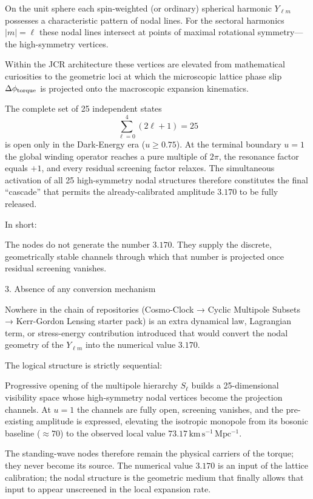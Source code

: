 On the unit sphere each spin-weighted (or ordinary) spherical harmonic \(Y_{\ell m}\) possesses a characteristic pattern of nodal lines. For the sectoral harmonics \(|m|=\ell\) these nodal lines intersect at points of maximal rotational symmetry—the high-symmetry vertices.

Within the JCR architecture these vertices are elevated from mathematical curiosities to the geometric loci at which the microscopic lattice phase slip \(\Delta\phi_{\rm torque}\) is projected onto the macroscopic expansion kinematics.  

The complete set of 25 independent states  
  \[
  \sum_{\ell=0}^{4}(2\ell+1)=25
  \]
  is open only in the Dark-Energy era (\(u\ge 0.75\)).  
At the terminal boundary \(u=1\) the global winding operator reaches a pure multiple of \(2\pi\), the resonance factor equals \(+1\), and every residual screening factor relaxes.  
The simultaneous activation of all 25 high-symmetry nodal structures therefore constitutes the final “cascade” that permits the already-calibrated amplitude \(3.170\) to be fully released.

In short:

The nodes do not generate the number \(3.170\).  
They supply the discrete, geometrically stable channels through which that number is projected once residual screening vanishes.

3. Absence of any conversion mechanism

Nowhere in the chain of repositories (Cosmo-Clock → Cyclic Multipole Subsets → Kerr-Gordon Lensing starter pack) is an extra dynamical law, Lagrangian term, or stress-energy contribution introduced that would convert the nodal geometry of the \(Y_{\ell m}\) into the numerical value \(3.170\).  

The logical structure is strictly sequential:
  
Progressive opening of the multipole hierarchy \(S_\ell\) builds a 25-dimensional visibility space whose high-symmetry nodal vertices become the projection channels.  
At \(u=1\) the channels are fully open, screening vanishes, and the pre-existing amplitude is expressed, elevating the isotropic monopole from its bosonic baseline (\(\approx 70\)) to the observed local value \(73.17\,\mathrm{km\,s^{-1}\,Mpc^{-1}}\).

The standing-wave nodes therefore remain the physical carriers of the torque; they never become its source. The numerical value \(3.170\) is an input of the lattice calibration; the nodal structure is the geometric medium that finally allows that input to appear unscreened in the local expansion rate.

